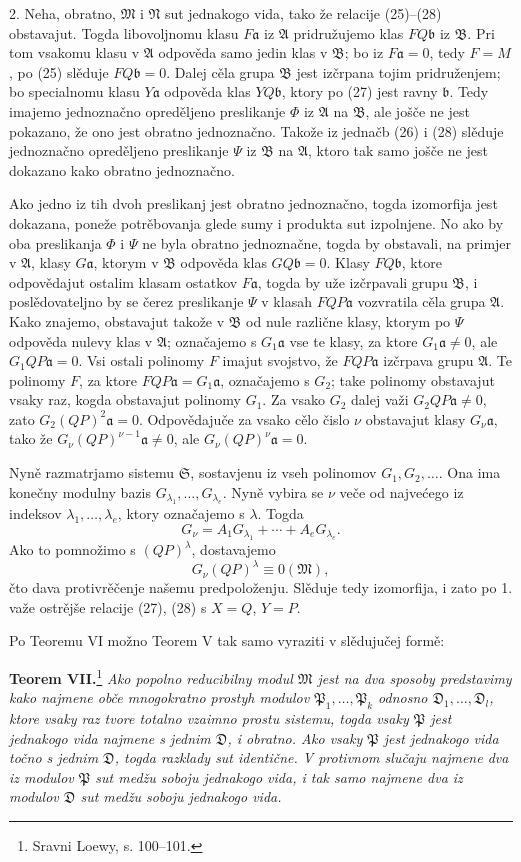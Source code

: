 \documentclass[11pt]{article}
\providecommand{\mM}{\mathfrak M}
\providecommand{\mN}{\mathfrak N}
\providecommand{\mA}{\mathfrak A}
\providecommand{\mB}{\mathfrak B}
\providecommand{\mP}{\mathfrak P}
\providecommand{\mD}{\mathfrak D}
\providecommand{\mS}{\mathfrak S}
\providecommand{\ma}{\mathfrak a}
\providecommand{\mb}{\mathfrak b}
\begin{document}
2. Neha, obratno, \(\mM\) i \(\mN\) sut jednakogo vida, tako že relacije (25)--(28) obstavajut. Togda libovoljnomu klasu \(F\ma\) iz \(\mA\) pridružujemo klas \(FQ\mb\) iz \(\mB\). Pri tom vsakomu klasu v \(\mA\) odpověda samo jedin klas v \(\mB\); bo iz \(F\ma=0\), tedy \(F=M\), po (25) slěduje \(FQ\mb=0\). Dalej cěla grupa \(\mB\) jest izčrpana tojim pridruženjem; bo specialnomu klasu \(Y\ma\) odpověda klas \(YQ\mb\), ktory po (27) jest ravny \(\mb\). Tedy imajemo jednoznačno opreděljeno preslikanje \(\Phi\) iz \(\mA\) na \(\mB\), ale jošče ne jest pokazano, že ono jest obratno jednoznačno. Takože iz jednačb (26) i (28) slěduje jednoznačno opreděljeno preslikanje \(\Psi\) iz \(\mB\) na \(\mA\), ktoro tak samo jošče ne jest dokazano kako obratno jednoznačno.

Ako jedno iz tih dvoh preslikanj jest obratno jednoznačno, togda izomorfija jest dokazana, poneže potrěbovanja glede sumy i produkta sut izpolnjene. No ako by oba preslikanja \(\Phi\) i \(\Psi\) ne byla obratno jednoznačne, togda by obstavali, na primjer v \(\mA\), klasy \(G\ma\), ktorym v \(\mB\) odpověda klas \(GQ\mb=0\). Klasy \(FQ\mb\), ktore odpovědajut ostalim klasam ostatkov \(F\ma\), togda by uže izčrpavali grupu \(\mB\), i poslědovateljno by se čerez preslikanje \(\Psi\) v klasah \(FQP\ma\) vozvratila cěla grupa \(\mA\). Kako znajemo, obstavajut takože v \(\mB\) od nule različne klasy, ktorym po \(\Psi\) odpověda nulevy klas v \(\mA\); označajemo s \(G_1\ma\) vse te klasy, za ktore \(G_1\ma\ne0\), ale \(G_1QP\ma=0\). Vsi ostali polinomy \(F\) imajut svojstvo, že \(FQP\ma\) izčrpava grupu \(\mA\). Te polinomy \(F\), za ktore \(FQP\ma=G_1\ma\), označajemo s \(G_2\); take polinomy obstavajut vsaky raz, kogda obstavajut polinomy \(G_1\). Za vsako \(G_2\) dalej važi \(G_2QP\ma\ne0\), zato \(G_2(QP)^2\ma=0\). Odpovědajuče za vsako cělo čislo \(\nu\) obstavajut klasy \(G_\nu\ma\), tako že \(G_\nu(QP)^{\nu-1}\ma\ne0\), ale \(G_\nu(QP)^\nu\ma=0\).

Nyně razmatrjamo sistemu \(\mS\), sostavjenu iz vseh polinomov \(G_1,G_2,\ldots\). Ona ima konečny modulny bazis \(G_{\lambda_1},\ldots,G_{\lambda_e}\). Nyně vybira se \(\nu\) veče od najvećego iz indeksov \(\lambda_1,\ldots,\lambda_e\), ktory označajemo s \(\lambda\). Togda
\[
 G_\nu=A_1G_{\lambda_1}+\cdots+A_eG_{\lambda_e}.
\]
Ako to pomnožimo s \((QP)^\lambda\), dostavajemo
\[
 G_\nu(QP)^\lambda\equiv0(\mM),
\]
čto dava protivrěčenje našemu predpoloženju. Slěduje tedy izomorfija, i zato po 1. važe ostrějše relacije (27), (28) s \(X=Q\), \(Y=P\).

Po Teoremu VI možno Teorem V tak samo vyraziti v slědujučej formě:

\textbf{Teorem VII.}\footnote{Sravni Loewy, s. 100--101.} \textit{Ako popolno reducibilny modul \(\mM\) jest na dva sposoby predstavimy kako najmene obče mnogokratno prostyh modulov \(\mP_1,\ldots,\mP_k\) odnosno \(\mD_1,\ldots,\mD_l\), ktore vsaky raz tvore totalno vzaimno prostu sistemu, togda vsaky \(\mP\) jest jednakogo vida najmene s jednim \(\mD\), i obratno. Ako vsaky \(\mP\) jest jednakogo vida točno s jednim \(\mD\), togda razklady sut identične. V protivnom slučaju najmene dva iz modulov \(\mP\) sut medžu soboju jednakogo vida, i tak samo najmene dva iz modulov \(\mD\) sut medžu soboju jednakogo vida.}
\end{document}
